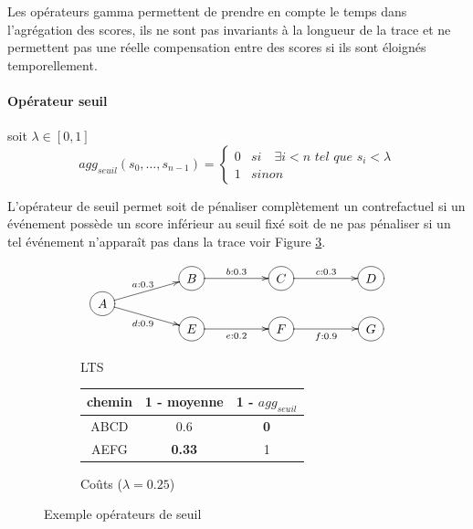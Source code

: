 \documentclass[11pt]{extarticle}
\begin{document}
    
    Les opérateurs gamma permettent de prendre en compte le temps dans l'agrégation des scores, ils ne sont pas invariants à la longueur de la trace et ne permettent pas une réelle compensation entre des scores si ils sont éloignés temporellement.

\paragraph{Opérateur seuil} soit $\lambda\in[0,1]$
\begin{equation}
    agg_{seuil}(s_0,\dots,s_{n-1}) = \begin{cases}
        0 & si \quad \exists i<n \textit{ tel que } s_i < \lambda
        \\ 1 & sinon
    \end{cases}
\end{equation}



L'opérateur de seuil permet soit de pénaliser complètement un contrefactuel si un événement possède un score inférieur au seuil fixé soit de ne pas pénaliser si un tel événement n'apparaît pas dans la trace voir Figure \ref{fig:seuil}. 

    \begin{figure}[h!]
        \centering
        \begin{subfigure}[b]{0.45\textwidth}
            \centering
            \[
            \xymatrix @R=0.1em@C=5em {
             & *++[o][F-]{B} \ar[r]^{b:0.3} & *++[o][F-]{C} \ar[r]^{c:0.3} & *++[o][F-]{D}  \\
              *++[o][F-]{A} \ar[ru]^{a:0.3} \ar[rd]_{d:0.9} \\
            & *++[o][F-]{E} \ar[r]_{e:0.2} & *++[o][F-]{F} \ar[r]_{f:0.9}  & *++[o][F-]{G}
            }
            \]
            \caption{LTS}
            \label{fig:lts_gamma}
        \end{subfigure}
        \hfill
        \begin{subfigure}[b]{0.45\textwidth}
            \centering
            \begin{tabular}{ccc}
                chemin & 1 - moyenne & 1 - $agg_{seuil}$   \\
                \hline
                ABCD & 0.6 & \textbf{0}  \\
                AEFG & \textbf{0.33} & 1 \\
            \end{tabular}
            \caption{Coûts ($\lambda =0.25$)}
            \label{fig:Coûts}
        \end{subfigure}
        \caption{Exemple opérateurs de seuil}
        \label{fig:seuil}
    \end{figure}
\end{document}
